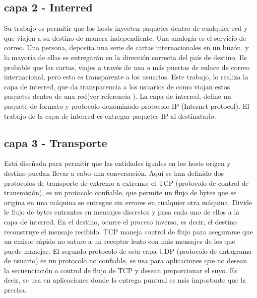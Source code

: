 \subsection{capa 2 - Interred}
Su trabajo es permitir que los hosts inyecten paquetes dentro de cualquier red y que viajen a su destino de manera independiente. Una analogía es el servicio de correo. Una persona, deposita una serie de cartas internacionales en un buzón, y la mayoría de ellas se entregarán en la dirección correcta del país de destino. Es probable que las cartas, viajes a través de una o más puertas de enlace de correo internacional, pero esto es transparente a los usuarios. Este trabajo, lo realiza la capa de interred, que da transparencia a los usuarios de como viajan estos paquetes dentro de una red(ver referencia \cite{Stallings2004}). 
La capa de interred, define un paquete de formato y protocolo denominado protocolo IP (Internet protocol). El trabajo de la capa de interred es entregar paquetes IP al destinatario. 

\subsection{capa 3 - Transporte}
Está diseñada para permitir que las entidades iguales en los hosts origen y destino puedan llevar a cabo una conversación. Aquí se han definido dos protocolos de transporte de extremo a extremo: el TCP (protocolo de control de transmisión), es un protocolo confiable, que permite un flujo de bytes que se origina en una máquina se entregue sin errores en cualquier otra máquina. Divide le flujo de bytes entrantes en mensajes discretos y pasa cada uno de ellos a la capa de interred. En el destino, ocurre el proceso inverso, es decir, el destino reconstruye el mensaje recibido. TCP maneja control de flujo para asegurarse que un emisor rápido no sature a un receptor lento con más mensajes de los que puede manejar. 
El segundo protocolo de esta capa UDP (protocolo de datagrama de usuario) es un protocolo no confiable, se usa para aplicaciones que no desean la secuenciación o control de flujo de TCP y desean proporcionar el suyo. Es decir, se usa en aplicaciones donde la entrega puntual es más importante que la precisa. 



